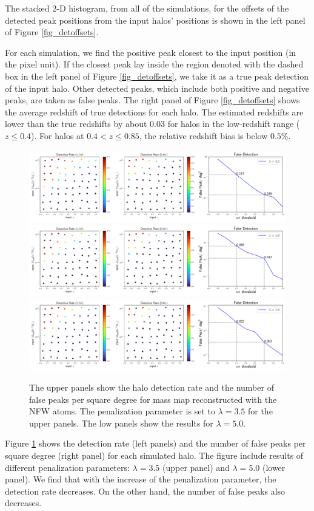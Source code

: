 The stacked $2$-D histogram, from all of the simulations, for the offsets of
the detected peak positions from the input halos' positions is shown in the
left panel of Figure \ref{fig_detoffsets}.

For each simulation, we find the positive peak closest to the input position
(in the pixel unit). If the closest peak lay inside the region denoted with
the dashed box in the left panel of Figure \ref{fig_detoffsets}, we take it as
a true peak detection of the input halo. Other detected peaks, which include both
positive and negative peaks, are taken as false peaks. The right
panel of Figure \ref{fig_detoffsets} shows the average redshift of true
detections for each halo. The estimated redshifts are lower than the true
redshifts by about $0.03$ for halos in the low-redshift range ($z\leq 0.4$).
For halos at $0.4<z\leq 0.85$, the relative redshift bias is below $0.5\%$.

\begin{figure}
 \centering
 \includegraphics[width=1.0\textwidth]{detfalse_threshold_NFW_lbd35.pdf}
 \includegraphics[width=1.0\textwidth]{detfalse_threshold_NFW_lbd40.pdf}
 \includegraphics[width=1.0\textwidth]{detfalse_threshold_NFW_lbd50.pdf}
 \caption{The upper panels show the halo detection rate and the number of false
     peaks per square degree for mass map reconstructed with the NFW atoms. The
     penalization parameter is set to $\lambda=3.5$ for the upper panels.  The
     low panels show the results for $\lambda=5.0$.
        } \label{fig_detFalsRateNFW}
\end{figure}

Figure \ref{fig_detFalsRateNFW} shows the detection rate (left panels) and the
number of false peaks per square degree (right panel) for each simulated halo.
The figure include results of different penalization parameters: $\lambda=3.5$
(upper panel) and $\lambda=5.0$ (lower panel).  We find that with the increase
of the penalization parameter, the detection rate decreases. On the other hand,
the number of false peaks also decreases.

